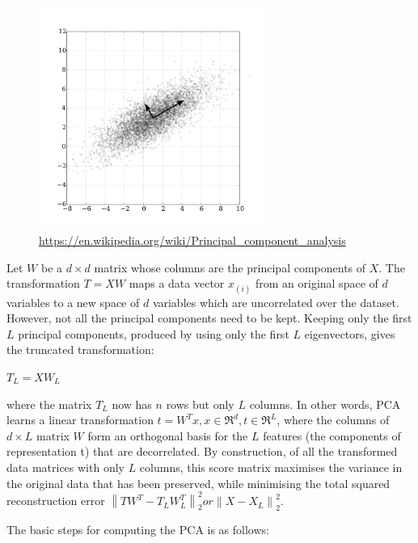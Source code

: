 \begin{figure}[!ht]
    \centering
    \includegraphics[width=0.65\textwidth]{fig/2-2.png}
    {\url{https://en.wikipedia.org/wiki/Principal_component_analysis}}
    \label{fig:phasesCompression}
\end{figure}


Let $W$ be a $d \times d$ matrix whose columns are the principal components of $X$. The transformation $T = X W$ maps a data vector $x_{(i)}$ from an original space of $d$ variables to a new space of $d$ variables which are uncorrelated over the dataset. However, not all the principal components need to be kept. Keeping only the first $L$ principal components, produced by using only the first $L$ eigenvectors, gives the truncated transformation:

$T_L = XW_L$


where the matrix $T_L$ now has $n$ rows but only $L$ columns. In other words, PCA learns a linear transformation 
$t = W^{T}x, x \in \Re^{d}, t \in \Re^{L}$, where the columns of $d \times L$ matrix $W$ form an orthogonal basis for the $L$ features (the components of representation t) that are decorrelated. By construction, of all the transformed data matrices with only $L$ columns, this score matrix maximises the variance in the original data that has been preserved, while minimising the total squared reconstruction error $\left \| TW^T - T_LW_L^T\right \|_2^2 or \left \| X - X_L \right \|_2^2$.

The basic steps for computing the PCA is as follows:

